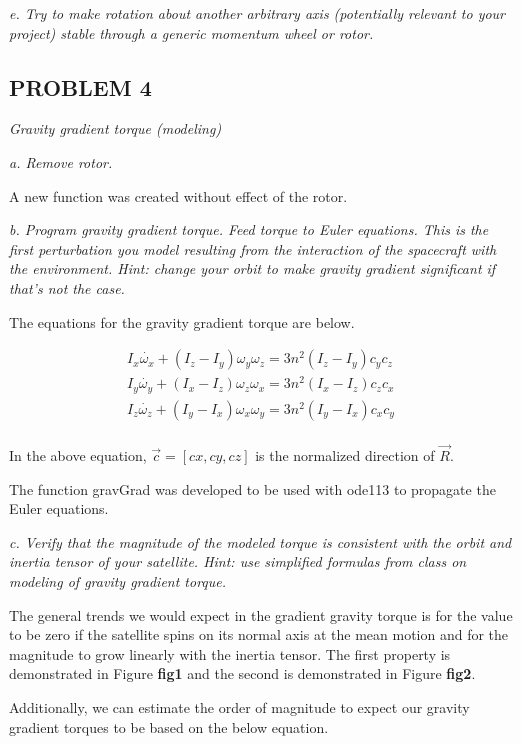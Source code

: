 \textit{e. Try to make rotation about another arbitrary axis (potentially relevant to your project) stable through a generic momentum wheel or rotor.}

\subsection{PROBLEM 4}
\textit{Gravity gradient torque (modeling)}

\textit{a. Remove rotor.}

A new function was created without effect of the rotor.

\textit{b. Program gravity gradient torque. Feed torque to Euler equations. This is the first perturbation you model resulting from the interaction of the spacecraft with the environment. Hint: change your orbit to make gravity gradient significant if that’s not the case.}

The equations for the gravity gradient torque are below.

\begin{align*}
    I_x \dot{\omega_x} + (I_z - I_y) \omega_y \omega_z = 3 n^2 (I_z - I_y) c_y c_z \\
    I_y \dot{\omega_y} + (I_x - I_z) \omega_z \omega_x = 3 n^2 (I_x - I_z) c_z c_x \\
    I_z \dot{\omega_z} + (I_y - I_x) \omega_x \omega_y = 3 n^2 (I_y - I_x) c_x c_y \\
\end{align*}

In the above equation, $\Vec{c} = [cx, cy, cz]$ is the normalized direction of $\Vec{R}$.

The function gravGrad was developed to be used with ode113 to propagate the Euler equations.



\textit{c. Verify that the magnitude of the modeled torque is consistent with the orbit and inertia tensor of your satellite. Hint: use simplified formulas from class on modeling of gravity gradient torque.}

The general trends we would expect in the gradient gravity torque is for the value to be zero if the satellite spins on its normal axis at the mean motion and for the magnitude to grow linearly with the inertia tensor. The first property is demonstrated in Figure \textbf{fig1} and the second is demonstrated in Figure \textbf{fig2}.

Additionally, we can estimate the order of magnitude to expect our gravity gradient torques to be based on the below equation.


